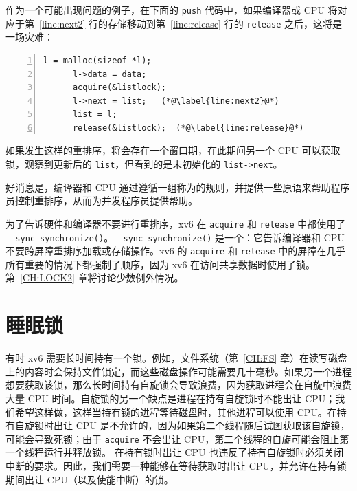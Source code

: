 作为一个可能出现问题的例子，在下面的 \lstinline{push} 代码中，如果编译器或 CPU 将对应于第~\ref{line:next2} 行的存储移动到第~\ref{line:release} 行的 \lstinline{release} 之后，这将是一场灾难：
\begin{lstlisting}[numbers=left,firstnumber=1]
      l = malloc(sizeof *l);
      l->data = data;
      acquire(&listlock);
      l->next = list;   (*@\label{line:next2}@*)
      list = l;      
      release(&listlock);  (*@\label{line:release}@*)
\end{lstlisting}
如果发生这样的重排序，将会存在一个窗口期，在此期间另一个 CPU 可以获取锁，观察到更新后的 \lstinline{list}，但看到的是未初始化的 \lstinline{list->next}。

好消息是，编译器和 CPU 通过遵循一组称为的规则，并提供一些原语来帮助程序员控制重排序，从而为并发程序员提供帮助。

为了告诉硬件和编译器不要进行重排序，xv6 在 \lstinline{acquire}  和 \lstinline{release}  中都使用了 \lstinline{__sync_synchronize()}。\lstinline{__sync_synchronize()} 是一个：它告诉编译器和 CPU 不要跨屏障重排序加载或存储操作。xv6 的 \lstinline{acquire} 和 \lstinline{release} 中的屏障在几乎所有重要的情况下都强制了顺序，因为 xv6 在访问共享数据时使用了锁。第~\ref{CH:LOCK2} 章将讨论少数例外情况。

\section{睡眠锁}


有时 xv6 需要长时间持有一个锁。例如，文件系统（第~\ref{CH:FS} 章）在读写磁盘上的内容时会保持文件锁定，而这些磁盘操作可能需要几十毫秒。如果另一个进程想要获取该锁，那么长时间持有自旋锁会导致浪费，因为获取进程会在自旋中浪费大量 CPU 时间。自旋锁的另一个缺点是进程在持有自旋锁时不能出让 CPU；我们希望这样做，这样当持有锁的进程等待磁盘时，其他进程可以使用 CPU。在持有自旋锁时出让 CPU 是不允许的，因为如果第二个线程随后试图获取该自旋锁，可能会导致死锁；由于 {\tt acquire} 不会出让 CPU，第二个线程的自旋可能会阻止第一个线程运行并释放锁。
在持有锁时出让 CPU 也违反了持有自旋锁时必须关闭中断的要求。因此，我们需要一种能够在等待获取时出让 CPU，并允许在持有锁期间出让 CPU（以及使能中断）的锁。

